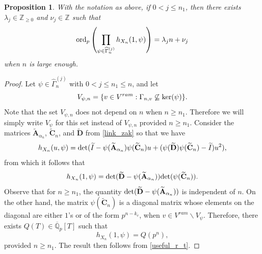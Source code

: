 \documentclass[11pt]{amsart}
\newtheorem{proposition}[theorem]{Proposition}
\numberwithin{equation}{section}
\theoremstyle{remark}
\theoremstyle{definition}
\begin{document}
\begin{proposition} \label{ram_i}
With the notation as above, if $0 < j \le n_{1}$, then there exists $\lambda_{j} \in \mathbb{Z}_{\ge 0}$ and $\nu_{j} \in \mathbb{Z}$ such that
$${\rm ord}_{p} \left( \prod_{\psi \in \widehat{\Gamma}_{n}^{(j)}} h_{X_{n}}(1,\psi)\right) = \lambda_{j}n + \nu_{j} $$
when $n$ is large enough.
\end{proposition}
\begin{proof}
Let $\psi \in \widehat{\Gamma}_{n}^{(j)}$ with $ 0 < j \le n_{1} \le n$, and let
$$V_{\psi,n} = \{v \in V^{ram}: \Gamma_{n,v} \not \subseteq {\rm ker}(\psi) \}. $$
Note that the set $V_{\psi,n}$ does not depend on $n$ when $n \ge n_{1}$.  Therefore we will simply write $V_{\psi}$ for this set instead of $V_{\psi,n}$ provided $n \ge n_{1}$.  Consider the matrices $\widetilde{\mathbf{A}}_{\alpha_{n}}$, $\widetilde{\mathbf{C}}_{n}$, and $\widetilde{\mathbf{D}}$ from \cref{link_zak} so that we have
$$h_{X_{n}}(u,\psi) = {\rm det}(\widetilde{I} - \psi(\widetilde{\mathbf{A}}_{\alpha_{n}})\psi(\widetilde{\mathbf{C}}_{n})u + (\psi(\widetilde{\mathbf{D}})\psi(\widetilde{\mathbf{C}}_{n})- \widetilde{I})u^{2}), $$
from which it follows that
$$h_{X_{n}}(1,\psi) = {\rm det}(\widetilde{\mathbf{D}} - \psi(\widetilde{\mathbf{A}}_{\alpha_{n}})){\rm det}(\psi(\widetilde{\mathbf{C}}_{n})). $$
Observe that for $n \ge n_{1}$, the quantity ${\rm det}(\widetilde{\mathbf{D}} - \psi(\widetilde{\mathbf{A}}_{\alpha_{n}}))$ is independent of $n$.  On the other hand, the matrix $\psi(\widetilde{\mathbf{C}}_{n})$ is a diagonal matrix whose elements on the diagonal are either $1$'s or of the form $p^{n - k_{v}}$, when $v \in V^{ram} \smallsetminus V_{\psi}$.  Therefore, there exists $Q(T) \in \overline{\mathbb{Q}}_{p}[T]$ such that
$$h_{X_{n}}(1,\psi) = Q(p^{n}), $$
provided $n \ge n_{1}$.  The result then follows from \cref{useful_r_t}.
\end{proof}
\end{document}

